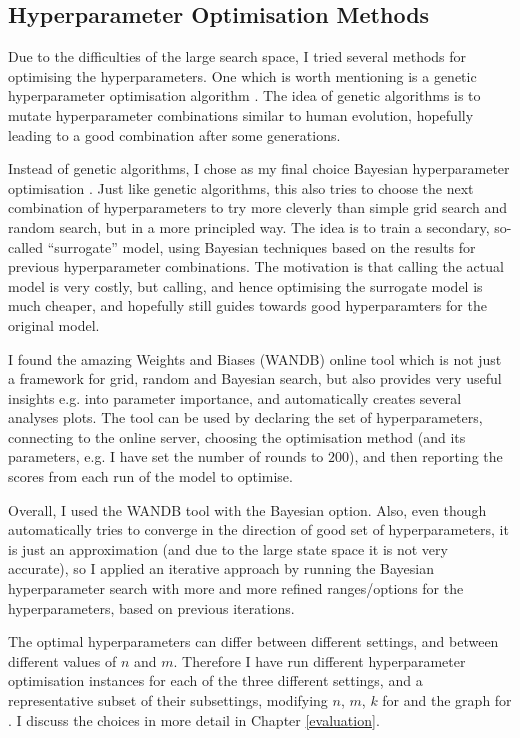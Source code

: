\subsection{Hyperparameter Optimisation Methods}

Due to the difficulties of the large search space, I tried several methods for optimising the hyperparameters. One which is worth mentioning is a genetic hyperparameter optimisation algorithm \cite{wicaksono2018genetichyper}. The idea of genetic algorithms is to mutate hyperparameter combinations similar to human evolution, hopefully leading to a good combination after some generations.


Instead of genetic algorithms, I chose as my final choice Bayesian hyperparameter optimisation \cite{eggensperger2013bayesianhyper}. Just like genetic algorithms, this also tries to choose the next combination of hyperparameters to try more cleverly than simple grid search and random search, but in a more principled way. The idea is to train a secondary, so-called ``surrogate'' model, using Bayesian techniques based on the results for previous hyperparameter combinations. The motivation is that calling the actual model is very costly, but calling, and hence optimising the surrogate model is much cheaper, and hopefully still guides towards good hyperparamters for the original model.


I found the amazing Weights and Biases (WANDB) online tool \cite{biewald2020wandb} which is not just a framework for grid, random and Bayesian search, but also provides very useful insights e.g. into parameter importance, and automatically creates several analyses plots. The tool can be used by declaring the set of hyperparameters, connecting to the online server, choosing the optimisation method (and its parameters, e.g. I have set the number of rounds to $200$), and then reporting the scores from each run of the model to optimise.


Overall, I used the WANDB tool with the Bayesian option. Also, even though automatically tries to converge in the direction of good set of hyperparameters, it is just an approximation (and due to the large state space it is not very accurate), so I applied an iterative approach by running the Bayesian hyperparameter search with more and more refined ranges/options for the hyperparameters, based on previous iterations.


The optimal hyperparameters can differ between different settings, and between different values of $n$ and $m$. Therefore I have run different hyperparameter optimisation instances for each of the three different settings, and a representative subset of their subsettings, modifying $n$, $m$, $k$ for \KThinning and the graph for \GraphicalTwoChoice. I discuss the choices in more detail in Chapter \ref{evaluation}.


